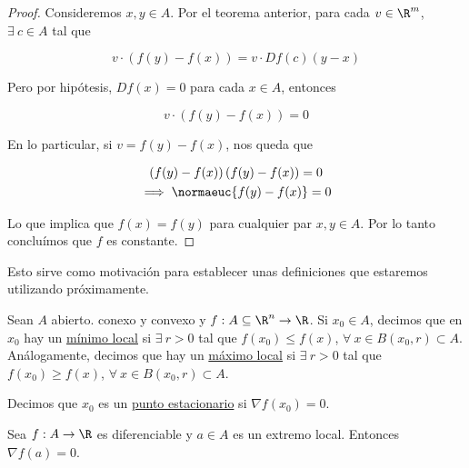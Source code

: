 \begin{proof}
    Consideremos $x, y \in A$. Por el teorema anterior, para cada $v \in \R^m$, $\exists~c \in A$ tal que
    
    \[
    v \cdot \left( f(y) - f(x) \right) = v \cdot Df(c)(y-x)
    \]
    
    Pero por hipótesis, $Df(x) = 0$ para cada $x \in A$, entonces
    
    \[
    v \cdot \left( f(y) - f(x) \right) = 0
    \]
    
    En lo particular, si $v = f(y) - f(x)$, nos queda que
    
    \begin{gather*}
        \left( f(y) - f(x) \right)\left( f(y) - f(x) \right) = 0 \\
        \implies \normaeuc{f(y) - f(x)} = 0
    \end{gather*}
    
    Lo que implica que $f(x) = f(y)$ para cualquier par $x, y \in A$. Por lo tanto concluímos que $f$ es constante.
\end{proof}

Esto sirve como motivación para establecer unas definiciones que estaremos utilizando próximamente.

\begin{defn}
    Sean $A$ abierto. conexo y convexo y $f: A \subseteq \R^n \rightarrow \R$. Si $x_0 \in A$, decimos que en $x_0$ hay un \ul{mínimo local} si $\exists~r > 0$ tal que $f(x_0) \leq f(x)$, $\forall~x \in B(x_0, r) \subset A$. Análogamente, decimos que hay un \ul{máximo local} si $\exists~r > 0$ tal que $f(x_0) \geq f(x)$, $\forall~x \in B(x_0, r) \subset A$.
    
    Decimos que $x_0$ es un \ul{punto estacionario} si $\nabla f(x_0) = 0$.
\end{defn}

\begin{teo}
    Sea $f: A \rightarrow \R$ es diferenciable y $a \in A$ es un extremo local. Entonces $\nabla f(a) = 0$.
\end{teo}

